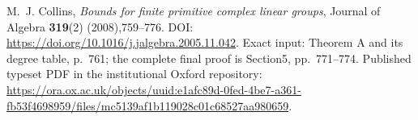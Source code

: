 M.~J. Collins,
\emph{Bounds for finite primitive complex linear groups},
Journal of Algebra \textbf{319}(2) (2008),759--776.
DOI: \url{https://doi.org/10.1016/j.jalgebra.2005.11.042}.
Exact input: Theorem A and its degree table, p.~761;
the complete final proof is Section5, pp.~771--774.
Published typeset PDF in the institutional Oxford repository:
\url{https://ora.ox.ac.uk/objects/uuid:e1afc89d-0fed-4be7-a361-fb53f4698959/files/mc5139af1b119028c01c68527aa980659}.
